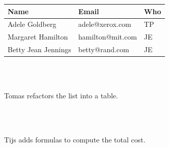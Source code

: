 \documentclass[english,submission]{programming}
\begin{document}
\begin{figure}
\begin{adjustwidth}{-2.5em}{-2.5em}
\begin{subfigure}[b]{22em}
{{   \begin{tabular}{| l | l | l |}
     \hline
     \textbf{Name} & \textbf{Email} & \textbf{Who} \\
     \hline \hline
     Adele Goldberg & adele@xerox.com & TP\\
     \hline
     Margaret Hamilton & hamilton@mit.com & JE\\
     \hline
     Betty Jean Jennings & betty@rand.com & JE\\
     \hline
   \end{tabular}
   \\~
   }}
   \caption{Tomas refactors the list into a table.}
   \label{fig:conf-tab}
\end{subfigure}
\\~\\
\begin{subfigure}[b]{18em}\vspace{0pt}
   \caption{Tijs adds formulas to compute the total cost.}
   \label{fig:conf-budget}
\end{subfigure}
\hfill
\begin{subfigure}[b]{22em}\vspace{0pt}
\end{subfigure}
\end{adjustwidth}
\end{figure}
\end{document}
